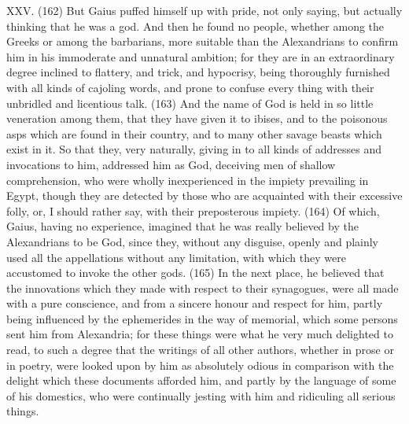 XXV. (162) But Gaius puffed himself up with pride, not only saying, but actually thinking that he was
a god. And then he found no people, whether among the Greeks or among the barbarians, more
suitable than the Alexandrians to confirm him in his immoderate and unnatural ambition; for they
are in an extraordinary degree inclined to flattery, and trick, and hypocrisy, being thoroughly
furnished with all kinds of cajoling words, and prone to confuse every thing with their unbridled and
licentious talk. (163) And the name of God is held in so little veneration among them, that they have
given it to ibises, and to the poisonous asps which are found in their country, and to many other
savage beasts which exist in it. So that they, very naturally, giving in to all kinds of addresses and
invocations to him, addressed him as God, deceiving men of shallow comprehension, who were
wholly inexperienced in the impiety prevailing in Egypt, though they are detected by those who are
acquainted with their excessive folly, or, I should rather say, with their preposterous impiety. (164)
Of which, Gaius, having no experience, imagined that he was really believed by the Alexandrians to
be God, since they, without any disguise, openly and plainly used all the appellations without any
limitation, with which they were accustomed to invoke the other gods. (165) In the next place, he
believed that the innovations which they made with respect to their synagogues, were all made with
a pure conscience, and from a sincere honour and respect for him, partly being influenced by the
ephemerides in the way of memorial, which some persons sent him from Alexandria; for these
things were what he very much delighted to read, to such a degree that the writings of all other
authors, whether in prose or in poetry, were looked upon by him as absolutely odious in
comparison with the delight which these documents afforded him, and partly by the language of
some of his domestics, who were continually jesting with him and ridiculing all serious things.

